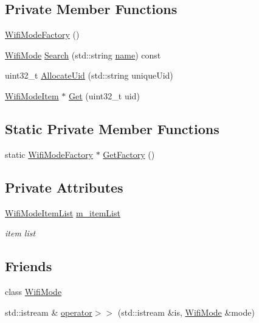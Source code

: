 \subsection*{Private Member Functions}
\begin{DoxyCompactItemize}
\item 
\hyperlink{classns3_1_1WifiModeFactory_a5f3f228863909a09b3f90b2a141c5c79}{Wifi\+Mode\+Factory} ()
\item 
\hyperlink{classns3_1_1WifiMode}{Wifi\+Mode} \hyperlink{classns3_1_1WifiModeFactory_ad01d633eda5df989e4fb5b84767a1378}{Search} (std\+::string \hyperlink{generate__test__data__lte__spectrum__model_8m_ab74e6bf80237ddc4109968cedc58c151}{name}) const 
\item 
uint32\+\_\+t \hyperlink{classns3_1_1WifiModeFactory_a89a9c38617bd3f7be4a8919ce9675996}{Allocate\+Uid} (std\+::string unique\+Uid)
\item 
\hyperlink{structns3_1_1WifiModeFactory_1_1WifiModeItem}{Wifi\+Mode\+Item} $\ast$ \hyperlink{classns3_1_1WifiModeFactory_a3086868810ff4347e31c63027726f544}{Get} (uint32\+\_\+t uid)
\end{DoxyCompactItemize}
\subsection*{Static Private Member Functions}
\begin{DoxyCompactItemize}
\item 
static \hyperlink{classns3_1_1WifiModeFactory}{Wifi\+Mode\+Factory} $\ast$ \hyperlink{classns3_1_1WifiModeFactory_a9c6f695d733355dee8d74bd1709868fc}{Get\+Factory} ()
\end{DoxyCompactItemize}
\subsection*{Private Attributes}
\begin{DoxyCompactItemize}
\item 
\hyperlink{classns3_1_1WifiModeFactory_a7fada023770ee50e77969b42324f16b5}{Wifi\+Mode\+Item\+List} \hyperlink{classns3_1_1WifiModeFactory_aa8fc74e45dbb82fc08d4d5eb967266e6}{m\+\_\+item\+List}
\begin{DoxyCompactList}\small\item\em item list \end{DoxyCompactList}\end{DoxyCompactItemize}
\subsection*{Friends}
\begin{DoxyCompactItemize}
\item 
class \hyperlink{classns3_1_1WifiModeFactory_af4f7ddea2391d3900ddb643f3bfeeefd}{Wifi\+Mode}
\item 
std\+::istream \& \hyperlink{classns3_1_1WifiModeFactory_a194738228e20bd2e40ba2f842a28d444}{operator$>$$>$} (std\+::istream \&is, \hyperlink{classns3_1_1WifiMode}{Wifi\+Mode} \&mode)
\end{DoxyCompactItemize}


